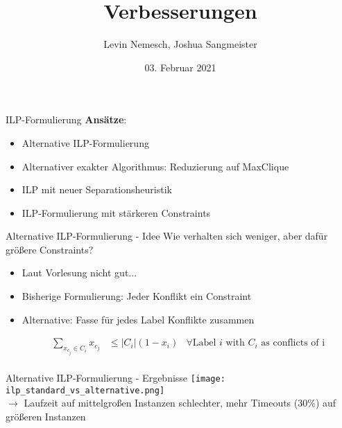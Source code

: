 \documentclass[ngerman,aspectratio=169,10pt]{beamer}
\title{Verbesserungen}
\date{03. Februar 2021}
\author{Levin Nemesch, Joshua Sangmeister}
\institute{Algorithm Engineering - Projekt}
\begin{document}
\maketitle

\begin{frame}{ILP-Formulierung}
	\textbf{Ansätze}:
    \begin{itemize}
        \item Alternative ILP-Formulierung
        \item Alternativer exakter Algorithmus: Reduzierung auf MaxClique
        \item ILP mit neuer Separationsheuristik
        \item ILP-Formulierung mit stärkeren Constraints
    \end{itemize}
\end{frame}

\begin{frame}{Alternative ILP-Formulierung - Idee}
    Wie verhalten sich weniger, aber dafür größere Constraints?
    \begin{itemize}
        \item Laut Vorlesung nicht gut...
        \item Bisherige Formulierung: Jeder Konflikt ein Constraint
        \item Alternative: Fasse für jedes Label Konflikte zusammen
    \end{itemize}

	\begin{align*}
        && \sum_{x_{c_j}\in C_i} x_{c_j} &\leq |C_i| (1- x_i) &\forall \text{Label $i$ with $C_i$ as conflicts of i}\\
    \end{align*}

\end{frame}

\begin{frame}{Alternative ILP-Formulierung - Ergebnisse}
    \centering
    \texttt{[image: ilp\_standard\_vs\_alternative.png]}\\
    $\longrightarrow$ Laufzeit auf mittelgroßen Instanzen schlechter, mehr Timeouts (30\%) auf größeren Instanzen
\end{frame}
\end{document}

